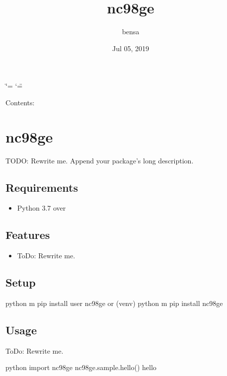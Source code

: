 \documentclass[letterpaper,10pt,english]{sphinxmanual}
\title{nc98ge}
\date{Jul 05, 2019}
\author{bensa}
\begin{document}
\ifdefined\shorthandoff
  \ifnum\catcode`\=\string=\active\shorthandoff{=}\fi
  \ifnum\catcode`\"=\active{}\fi
\fi

\pagestyle{empty}
\sphinxmaketitle
\pagestyle{plain}
\sphinxtableofcontents
\pagestyle{normal}
\label{\detokenize{index::doc}}


Contents:


\chapter{nc98ge}
\label{\detokenize{README:nc98ge}}\label{\detokenize{README::doc}}
TODO: Rewrite me. Append your package’s long description.


\section{Requirements}
\label{\detokenize{README:requirements}}\begin{itemize}
\item {} 
Python 3.7 over

\end{itemize}


\section{Features}
\label{\detokenize{README:features}}\begin{itemize}
\item {} 
ToDo: Rewrite me.

\end{itemize}


\section{Setup}
\label{\detokenize{README:setup}}
\begin{sphinxVerbatim}[commandchars=\\\{\}]
\PYGZdl{} python \PYGZhy{}m pip install \PYGZhy{}\PYGZhy{}user nc98ge
or
(venv)\PYGZdl{} python \PYGZhy{}m pip install nc98ge
\end{sphinxVerbatim}


\section{Usage}
\label{\detokenize{README:usage}}
ToDo: Rewrite me.

\begin{sphinxVerbatim}[commandchars=\\\{\}]
\PYGZdl{} python
\PYGZgt{}\PYGZgt{}\PYGZgt{} import nc98ge
\PYGZgt{}\PYGZgt{}\PYGZgt{} nc98ge.sample.hello()
\PYGZsq{}hello\PYGZsq{}
\PYGZgt{}\PYGZgt{}\PYGZgt{}
\end{sphinxVerbatim}
\end{document}
